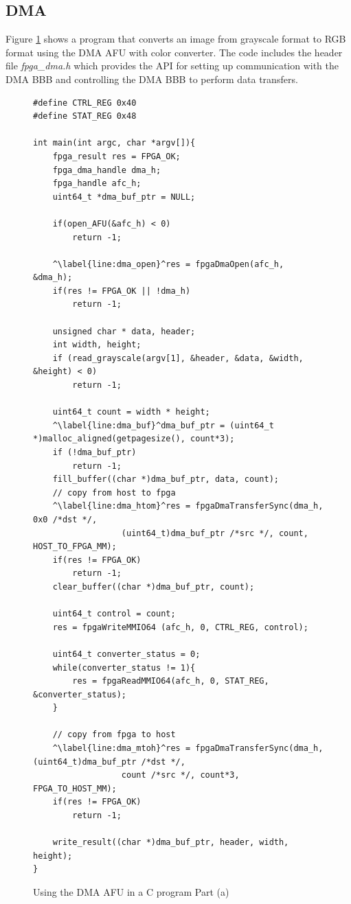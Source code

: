 \documentclass[11pt, twoside, pdftex]{article}
\begin{document}
 \subsection{DMA}
 Figure \ref{fig:dma_C_code} shows a program that converts an image from grayscale format to RGB format using the DMA AFU with color converter. The code includes the header file \emph{fpga\_dma.h} which provides the API for setting up communication with the DMA BBB and controlling the DMA BBB to perform data transfers.\\
 \lstset{language=C,numbers=left}
\begin{figure}[H]
\begin{center}
\begin{minipage}[h]{17 cm}
\begin{lstlisting}[name=DMA_code, escapechar=\^]
#define CTRL_REG 0x40
#define STAT_REG 0x48

int main(int argc, char *argv[]){
	fpga_result res = FPGA_OK;
	fpga_dma_handle dma_h;
	fpga_handle afc_h;
	uint64_t *dma_buf_ptr = NULL;

	if(open_AFU(&afc_h) < 0)
		return -1;
		
	^\label{line:dma_open}^res = fpgaDmaOpen(afc_h, &dma_h);
	if(res != FPGA_OK || !dma_h)
		return -1;

	unsigned char * data, header;
	int width, height;
	if (read_grayscale(argv[1], &header, &data, &width, &height) < 0) 
		return -1;
	
	uint64_t count = width * height;
	^\label{line:dma_buf}^dma_buf_ptr = (uint64_t *)malloc_aligned(getpagesize(), count*3);
	if (!dma_buf_ptr)
		return -1;
	fill_buffer((char *)dma_buf_ptr, data, count);
	// copy from host to fpga
	^\label{line:dma_htom}^res = fpgaDmaTransferSync(dma_h, 0x0 /*dst */,
				  (uint64_t)dma_buf_ptr /*src */, count, HOST_TO_FPGA_MM);
	if(res != FPGA_OK)
		return -1;
	clear_buffer((char *)dma_buf_ptr, count);
	
	uint64_t control = count;
	res = fpgaWriteMMIO64 (afc_h, 0, CTRL_REG, control); 

	uint64_t converter_status = 0;
	while(converter_status != 1){
		res = fpgaReadMMIO64(afc_h, 0, STAT_REG, &converter_status);
	}

	// copy from fpga to host
	^\label{line:dma_mtoh}^res = fpgaDmaTransferSync(dma_h, (uint64_t)dma_buf_ptr /*dst */,
				  count /*src */, count*3, FPGA_TO_HOST_MM);
	if(res != FPGA_OK)
		return -1;

	write_result((char *)dma_buf_ptr, header, width, height);
}
\end{lstlisting}
\end{minipage}
\caption{Using the DMA AFU in a C program Part (a)}
\label{fig:dma_C_code}
\end{center}
\end{figure}
\end{document}
